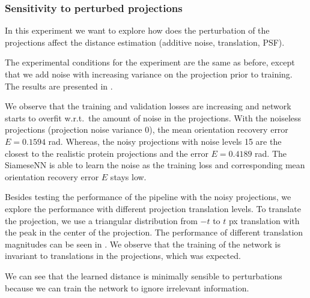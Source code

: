 \subsubsection{Sensitivity to perturbed projections}\label{sec:results:distance-estimation:sensitivity}


In this experiment we want to explore how does the perturbation of the projections affect the distance estimation (additive noise, translation, PSF).

The experimental conditions for the experiment are the same as before, except that we add noise with increasing variance on the projection prior to training.
The results are presented in .

We observe that the training and validation losses are increasing and network starts to overfit w.r.t.\ the amount of noise in the projections.
With the noiseless projections (projection noise variance 0), the mean orientation recovery error $E = 0.1594$ rad.
Whereas, the noisy projections with noise levels 15 are the closest to the realistic protein projections and the error $E=0.4189$ rad.
The SiameseNN is able to learn the noise as the training loss and corresponding mean orientation recovery error $E$ stays low.

Besides testing the performance of the pipeline with the noisy projections, we explore the performance with different projection translation levels.
To translate the projection, we use a triangular distribution from $-t$ to $t$ px translation with the peak in the center of the projection.
The performance of different translation magnitudes can be seen in .
We observe that the training of the network is invariant to translations in the projections, which was expected.

We can see that the learned distance is minimally sensible to perturbations because we can train the network to ignore irrelevant information.


